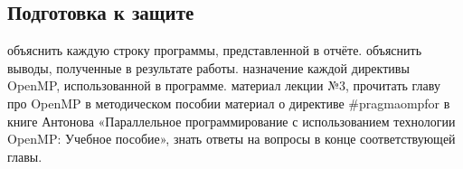 { %
	\subsection{Подготовка к защите}
	\begin{enumerate}
		 объяснить каждую строку программы, представленной в отчёте.
		 объяснить выводы, полученные в результате работы.
		 назначение каждой директивы OpenMP, использованной в программе.
		 материал лекции №3, прочитать главу про OpenMP в методическом пособии
		 материал о директиве \#pragma\textunderscore omp\textunderscore for в книге Антонова «Параллельное программирование с использованием технологии OpenMP: Учебное пособие», знать ответы на вопросы в конце соответствующей главы.
	\end{enumerate}
}